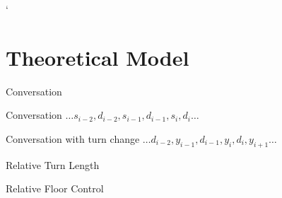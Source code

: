 `%

\section{Theoretical Model}
\frame{\sectionpage}

\begin{frame}{Conversation}


  \begin{alertblock}{Conversation}
    { $\ldots  s_{i-2}, d_{i-2}, s_{i-1} , d_{i-1}, s_i, d_i  \ldots$  }
  \end{alertblock}
  \begin{alertblock}{Conversation with turn change}
     $\ldots d_{i-2}, y_{i-1}, d_{i-1}, y_{i} , d_i, y_{i+1}\ldots$
  \end{alertblock}
\end{frame}

\begin{frame}{Relative Turn Length}
\end{frame}

\begin{frame}{Relative Floor Control}
\end{frame}
